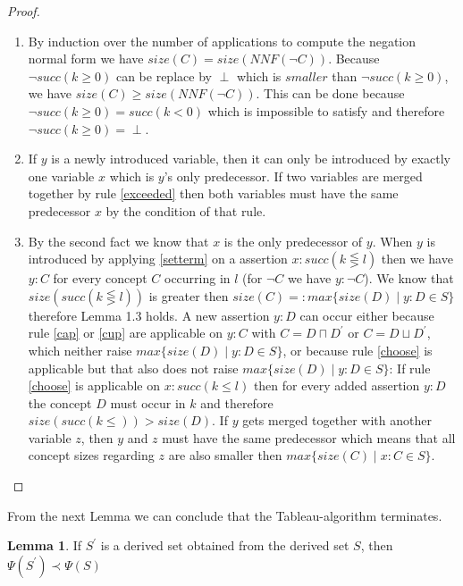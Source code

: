 \documentclass[a4paper,11pt]{scrartcl}
\theoremstyle{break}
\theoremstyle{definition}
\newtheorem{mylem}{Lemma}
\begin{document}
\begin{proof}$ $\\
\vspace*{-5mm}
\begin{enumerate}
\item By induction over the number of applications to compute the negation normal form we have $size(C)=size(NNF(\neg C))$. Because $\neg succ(k\geq0)$ can be replace by $\perp$ which is $smaller$ than $\neg succ(k\geq 0)$, we have $size(C)\geq size(NNF(\neg C))$. This can be done because $\neg succ(k\geq 0)= succ(k<0)$ which is impossible to satisfy and therefore $\neg succ(k\geq 0)=\perp$.
\item If $y$ is a newly introduced variable, then it can only be introduced by exactly one variable $x$ which is $y$'s only predecessor. If two variables are merged together by rule \ref{exceeded} then both variables must have the same predecessor $x$ by the condition of that rule.
\item By the second fact we know that $x$ is the only predecessor of $y$. When $y$ is introduced by applying \ref{setterm} on a assertion $x:succ(k\lesseqgtr l)$ then we have $y:C$ for every concept $C$ occurring in $l$ (for $\neg C$ we have $y:\neg C$). We know that $size(succ(k\lesseqgtr l))$ is greater then $size(C)=:max\{size(D)\mid y:D\in S\}$ therefore Lemma 1.3 holds. A new assertion $y:D$ can occur either because rule \ref{cap} or \ref{cup} are applicable on $y:C$ with $C=D\sqcap D^\prime$ or $C=D\sqcup D^\prime$, which neither raise $max\{size(D)\mid y:D \in S\}$, or because rule \ref{choose} is applicable but that also does not raise $max\{size(D)\mid y:D \in S\}$: If rule \ref{choose} is applicable on $x:succ(k\leq l)$ then for every added assertion $y:D$ the concept $D$ must occur in $k$ and therefore $size(succ(k\leq))>size(D)$. If $y$ gets merged together with another variable $z$, then $y$ and $z$ must have the same predecessor which means that all concept sizes regarding $z$ are also smaller then $max\{size(C)\mid x:C\in S\}$. 
\end{enumerate}
\end{proof}
From the next Lemma we can conclude that the Tableau-algorithm terminates.
\begin{mylem}
If $S^\prime$ is a derived set obtained from the derived set $S$, then $\Psi(S^\prime)\prec\Psi(S)$
\end{mylem}
\end{document}
